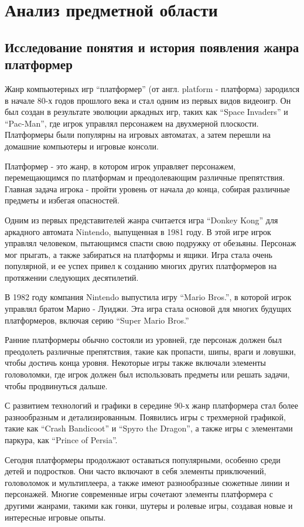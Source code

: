 \section{Анализ предметной области}
\subsection{Исследование понятия и история появления жанра платформер}

Жанр компьютерных игр “платформер” (от англ. platform - платформа) зародился в начале 80-х годов прошлого века и стал одним из первых видов видеоигр. Он был создан в результате эволюции аркадных игр, таких как “Space Invaders” и “Pac-Man”, где игрок управлял персонажем на двухмерной плоскости. Платформеры были популярны на игровых автоматах, а затем перешли на домашние компьютеры и игровые консоли.

Платформер - это жанр, в котором игрок управляет персонажем, перемещающимся по платформам и преодолевающим различные препятствия. Главная задача игрока - пройти уровень от начала до конца, собирая различные предметы и избегая опасностей.

Одним из первых представителей жанра считается игра “Donkey Kong” для аркадного автомата Nintendo, выпущенная в 1981 году. В этой игре игрок управлял человеком, пытающимся спасти свою подружку от обезьяны. Персонаж мог прыгать, а также забираться на платформы и ящики. Игра стала очень популярной, и ее успех привел к созданию многих других платформеров на протяжении следующих десятилетий.

В 1982 году компания Nintendo выпустила игру “Mario Bros.”, в которой игрок управлял братом Марио - Луиджи. Эта игра стала основой для многих будущих платформеров, включая серию “Super Mario Bros.”

Ранние платформеры обычно состояли из уровней, где персонаж должен был преодолеть различные препятствия, такие как пропасти, шипы, враги и ловушки, чтобы достичь конца уровня. Некоторые игры также включали элементы головоломки, где игрок должен был использовать предметы или решать задачи, чтобы продвинуться дальше.

С развитием технологий и графики в середине 90-х жанр платформера стал более разнообразным и детализированным. Появились игры с трехмерной графикой, такие как “Crash Bandicoot” и “Spyro the Dragon”, а также игры с элементами паркура, как “Prince of Persia”.

Сегодня платформеры продолжают оставаться популярными, особенно среди детей и подростков. Они часто включают в себя элементы приключений, головоломок и мультиплеера, а также имеют разнообразные сюжетные линии и персонажей. Многие современные игры сочетают элементы платформера с другими жанрами, такими как гонки, шутеры и ролевые игры, создавая новые и интересные игровые опыты.

